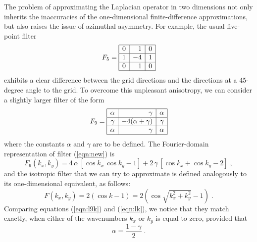 
The problem of approximating the Laplacian operator in two dimensions
not only inherits the inaccuracies of the one-dimensional
finite-difference approximations, but also raises the issue of
azimuthal asymmetry. For example, the usual five-point filter
\begin{equation}
\label{eqn:usual}
F_5 =
\begin{array}{|r|r|r|}
\hline
0 & 1 & 0 \\ \hline
1 & -4 & 1 \\ \hline
0 & 1 & 0  \\ \hline 
\end{array}
\end{equation}
exhibits a clear difference between the grid directions and the
directions at a 45-degree angle to the grid. To overcome this
unpleasant anisotropy, we can consider a slightly larger filter of the
form
\begin{equation}
\label{eqn:new}
F_9 = \begin{array}{|r|r|r|}
\hline
\alpha & \gamma & \alpha \\ \hline
\gamma & -4 (\alpha+\gamma) & \gamma \\ \hline
\alpha & \gamma & \alpha  \\ \hline 
\end{array}
\end{equation}
where the constants $\alpha$ and $\gamma$ are to be defined. The
Fourier-domain representation of filter (\ref{eqn:new}) is
\begin{equation}
  \label{eqn:l9k}
  F_9 (k_x,k_y) = 4\,\alpha\,[\cos{k_x}\,\cos{k_y} - 1] +
  2\,\gamma\,[\cos{k_x}+\cos{k_y}-2]\;,
\end{equation}
and the isotropic filter that we can try to approximate is defined
analogously to its one-dimensional equivalent, as follows:
\begin{equation}
  \label{eqn:lk}
  F (k_x,k_y) = 2 (\cos{k} -1) = 2 (\cos{\sqrt{k_x^2+k_y^2}} - 1)\;.
\end{equation}
Comparing equations (\ref{eqn:l9k}) and (\ref{eqn:lk}), we notice that
they match exactly, when either of the wavenumbers $k_x$ or $k_y$ is
equal to zero, provided that 
\begin{equation}
  \label{eqn:alpha}
  \alpha = \frac{1-\gamma}{2}\;.
\end{equation}
